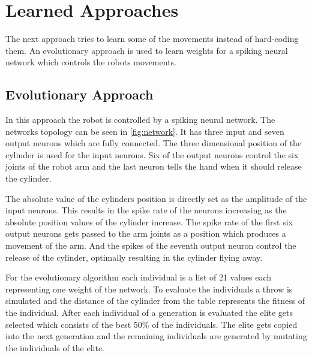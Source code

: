 \section{Learned Approaches}
\label{sec:learned}
The next approach tries to learn some of the movements instead of hard-coding them.
An evolutionary approach is used to learn weights for a spiking neural network which controls the robots movements.

\subsection{Evolutionary Approach}
In this approach the robot is controlled by a spiking neural network.
The networks topology can be seen in \autoref{fig:network}.
It has three input and seven output neurons which are fully connected.
The three dimensional position of the cylinder is used for the input neurons.
Six of the output neurons control the six joints of the robot arm and the last neuron tells the hand when it should release the cylinder.

The absolute value of the cylinders position is directly set as the amplitude of the input neurons.
This results in the spike rate of the neurons increasing as the absolute position values of the cylinder increase.
The spike rate of the first six output neurons gets passed to the arm joints as a position which produces a movement of the arm.
And the spikes of the seventh output neuron control the release of the cylinder, optimally resulting in the cylinder flying away.

For the evolutionary algorithm each individual is a list of 21 values each representing one weight of the network.
To evaluate the individuals a throw is simulated and the distance of the cylinder from the table represents the fitness of the individual.
After each individual of a generation is evaluated the elite gets selected which consists of the best 50\% of the individuals.
The elite gets copied into the next generation and the remaining individuals are generated by mutating the individuals of the elite.

